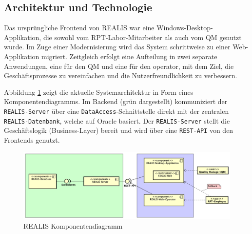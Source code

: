 \subsection{Architektur und Technologie}
Das ursprüngliche Frontend von REALIS war eine Windows-Desktop-Applikation, die sowohl vom \gls{RPT}-Labor-Mitarbeiter als auch vom \gls{QM} genutzt wurde. Im Zuge einer Modernisierung wird das System schrittweise zu einer Web-Applikation migriert. Zeitgleich erfolgt eine Aufteilung in zwei separate Anwendungen, eine für den \gls{QM} und eine für den \gls{operator}, mit dem Ziel, die Geschäftsprozesse zu vereinfachen und die Nutzerfreundlichkeit zu verbessern.

Abbildung \ref{fig:realis-komponentendiagramm} zeigt die aktuelle Systemarchitektur in Form eines Komponentendiagramms. Im Backend (grün dargestellt) kommuniziert der \texttt{REALIS-Server} über eine \texttt{DataAccess}-Schnittstelle direkt mit der zentralen \texttt{REALIS-Datenbank}, welche auf Oracle basiert. Der \texttt{REALIS-Server} stellt die Geschäftslogik (Business-Layer) bereit und wird über eine \texttt{REST-API} von den Frontends genutzt.

\begin{figure}[!h]
    \centering
    \includegraphics[width=1\textwidth]{bilder/REALIS-Komponentendiagramm.png}
    \caption{REALIS Komponentendiagramm}
    \label{fig:realis-komponentendiagramm}
\end{figure}

